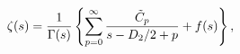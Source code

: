 \begin{equation}
    \label{mittagleffler}
    \zeta(s) = {1\over \Gamma(s)}
    \left\{ \sum_{p=0}^\infty {\tilde{C}_p\over s-D_2/2 +p}
        +f(s)\right\},
\end{equation}

